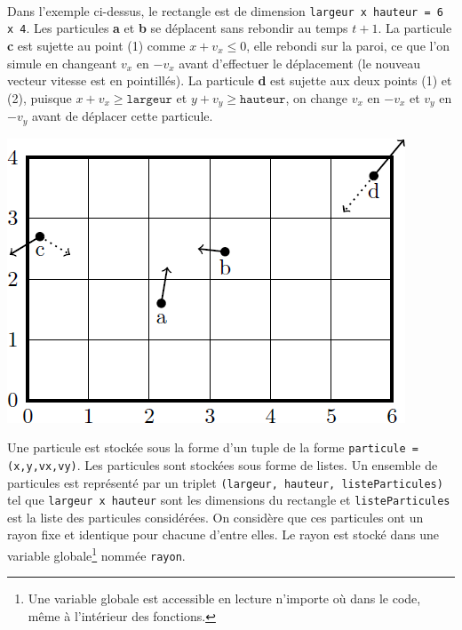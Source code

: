 \documentclass[10pt,fleqn]{article} %
\begin{document}
\begin{exemple}~\\

\begin{minipage}[c]{.6\linewidth}
Dans l'exemple ci-dessus, le rectangle est de dimension \texttt{largeur x hauteur = 6 x 4}. Les particules \textbf{a} et \textbf{b} se déplacent sans rebondir au temps $t+1$. La particule \textbf{c} est sujette au point (1) comme $x+v_x\leq 0$, elle rebondi sur la paroi, ce que l'on simule en changeant $v_x$ en $-v_x$ avant d'effectuer le déplacement (le nouveau vecteur vitesse est en pointillés). La particule \textbf{d} est sujette aux deux points (1) et (2), puisque $x+v_x \geq \texttt{largeur}$ et  $y+v_y \geq \texttt{hauteur}$, on change $v_x$ en $-v_x$ et  $v_y$ en $-v_y$ avant de déplacer cette particule. 
\end{minipage}
\begin{minipage}[c]{.35\linewidth}
\begin{center}
\includegraphics[width=.9\linewidth]{images/fig_01}
\end{center}
\end{minipage}
\end{exemple}

Une particule est stockée sous la forme d'un tuple de la forme \texttt{particule = (x,y,vx,vy)}.
Les particules sont stockées sous forme de listes. Un ensemble de particules est représenté par un triplet \texttt{(largeur, hauteur, listeParticules)} tel que \texttt{largeur x hauteur} sont les dimensions du rectangle et \texttt{listeParticules} est la liste des particules considérées. On considère que ces particules ont un rayon fixe et identique pour chacune d'entre elles. Le rayon est stocké dans une variable globale\footnote{Une variable globale est accessible en lecture n'importe où dans le code, même
à l'intérieur des fonctions.} nommée \texttt{rayon}.
\end{document}
